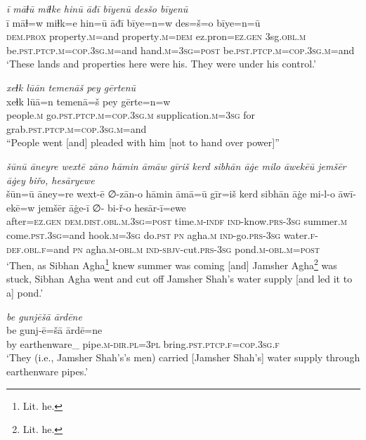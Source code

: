 \ea \label{DP.28}
\textit{ī māɫū miɫke hinū āđī bīyenū desšo bīyenū} \\ 
\gll ī māɫ=w miɫk=e hin=ū āđī bīye=n=w des=š=o bīye=n=ū \\ 
 \textsc{dem.prox} property\textsc{.m}=and property\textsc{.m}\textsc{=dem} ez.pron\textsc{=ez}\textsc{.gen} 3sg\textsc{.obl}\textsc{.m} be\textsc{.pst}\textsc{.ptcp}\textsc{.m}\textsc{=cop}\textsc{.3sg}\textsc{.m}=and hand\textsc{.m}\textsc{=3sg}\textsc{=\textsc{post}} be\textsc{.pst}\textsc{.ptcp}\textsc{.m}\textsc{=cop}\textsc{.3sg}\textsc{.m}=and \\ 
\glt `These lands and properties here were his. They were under his control.'
\z 
 
\ea \label{DP.29}
\textit{xeɫk lūān temenāš pey gērtenū} \\ 
\gll xeɫk lūā=n temenā=š pey gērte=n=w \\ 
 people\textsc{.m} go\textsc{.pst}\textsc{.ptcp}\textsc{.m}\textsc{=cop}\textsc{.3sg}\textsc{.m} supplication\textsc{.m}\textsc{=3sg} for grab\textsc{.pst}\textsc{.ptcp}\textsc{.m}\textsc{=cop}\textsc{.3sg}\textsc{.m}=and \\ 
\glt ``People went [and] pleaded with him [not to hand over power]''
\z 
 
\ea \label{DP.30}
\textit{šūnū āneyre wextē zāno hāmin āmāw gīriš kerd sibhān āġe milo āwekēū jemšēr āġey biřo, hesāryewe} \\ 
\gll šūn=ū āney=re wext-ē ∅-zān-o hāmin āmā=ū gīr=iš kerd sibhān āġe mi-l-o āwī-ekē=w jemšēr āġe-ī ∅- bi-ř-o hesār-ī=ewe \\ 
 after\textsc{=ez}\textsc{.gen} \textsc{dem.dist}\textsc{.obl}\textsc{.m}\textsc{.3sg}\textsc{=\textsc{post}} time\textsc{.m}\textsc{-indf} \textsc{ind-}know\textsc{.prs}\textsc{-3sg} summer\textsc{.m} come\textsc{.pst}\textsc{.3sg}=and hook\textsc{.m}\textsc{=3sg} do\textsc{.pst} \textsc{pn} agha\textsc{.m} \textsc{ind-}go\textsc{.prs}\textsc{-3sg} water\textsc{\textsc{.f}}\textsc{-def}\textsc{.obl}\textsc{\textsc{.f}}=and \textsc{pn} agha\textsc{.m}\textsc{-obl}\textsc{.m} \textsc{ind-}\textsc{sbjv-}cut\textsc{.prs}\textsc{-3sg} pond\textsc{.m}\textsc{-obl}\textsc{.m}\textsc{=\textsc{post}} \\ 
\glt `Then, as Sibhan Agha\footnote{Lit. he.} knew summer was coming [and] Jamsher Agha\footnote{Lit. he.} was stuck, Sibhan Agha went and cut off Jamsher Shah’s water supply [and led it to a] pond.'
\z 
 
\ea \label{DP.31}
\textit{be gunjēšā ārdēne} \\ 
\gll be gunj-ē=šā ārdē=ne \\ 
 by earthenware\_ pipe\textsc{.m}\textsc{-dir}\textsc{.pl}\textsc{=3pl} bring\textsc{.pst}\textsc{.ptcp}\textsc{\textsc{.f}}\textsc{=cop}\textsc{.3sg}\textsc{\textsc{.f}} \\ 
\glt `They (i.e., Jamsher Shah’s’s men) carried [Jamsher Shah’s] water supply through earthenware pipes.'
\z 
 
